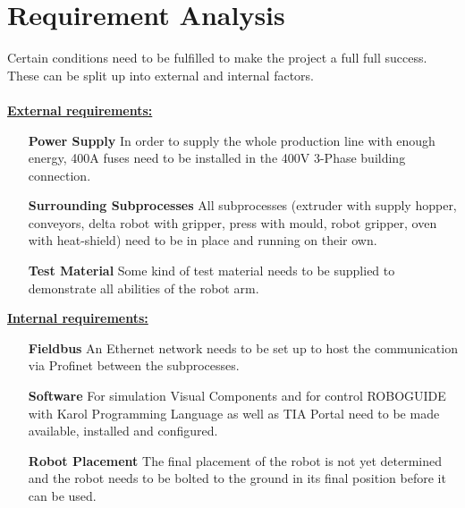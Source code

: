 
\chapter{Requirement Analysis}

Certain conditions need to be fulfilled to make the project a full full success. 
These can be split up into external and internal factors.\\
\\
\underline{\textbf{External requirements:}}\vspace{2mm}
\begin{itemize}[leftmargin=5cm]
	\item[\textbf{Power Supply}] In order to supply the whole production line with enough energy, 400A fuses need to be installed in the 400V 3-Phase building connection.
	\item[\textbf{Surrounding Subprocesses}] All subprocesses (extruder with supply hopper, conveyors, delta robot with gripper, press with mould, robot gripper, oven with heat-shield) need to be in place and running on their own.
	\item[\textbf{Test Material}] Some kind of test material needs to be supplied to demonstrate all abilities of the robot arm.
\end{itemize}
\bigskip
\underline{\textbf{Internal requirements:}}\vspace{2mm}
\begin{itemize}[leftmargin=5cm]
	\item[\textbf{Fieldbus}] An Ethernet network needs to be set up to host the communication via Profinet between the subprocesses.
	\item[\textbf{Software}] For simulation Visual Components and for control ROBOGUIDE with Karol Programming Language as well as TIA Portal need to be made available, installed and configured. 
	\item[\textbf{Robot Placement}] The final placement of the robot is not yet determined and the robot needs to be bolted to the ground in its final position before it can be used.
\end{itemize}
\bigskip

